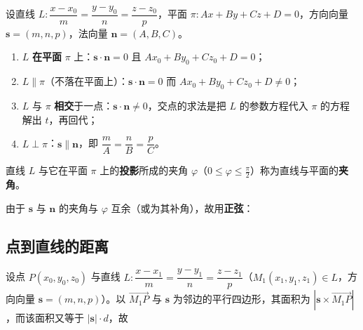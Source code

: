 设直线 $L:\dfrac{x-x_0}{m}=\dfrac{y-y_0}{n}=\dfrac{z-z_0}{p}$，平面 $\pi:Ax+By+Cz+D=0$，方向向量 $\boldsymbol{s}=(m,n,p)$，法向量 $\boldsymbol{n}=(A,B,C)$。

\begin{enumerate}
\item $L$ \textbf{在平面} $\pi$ 上：$\boldsymbol{s}\cdot\boldsymbol{n}=0$ 且 $Ax_0+By_0+Cz_0+D=0$；
\item $L\parallel\pi$（不落在平面上）：$\boldsymbol{s}\cdot\boldsymbol{n}=0$ 而 $Ax_0+By_0+Cz_0+D\neq0$；
\item $L$ 与 $\pi$ \textbf{相交}于一点：$\boldsymbol{s}\cdot\boldsymbol{n}\neq0$，交点的求法是把 $L$ 的参数方程代入 $\pi$ 的方程解出 $t$，再回代；
\item $L\perp\pi$：$\boldsymbol{s}\parallel\boldsymbol{n}$，即 $\dfrac{m}{A}=\dfrac{n}{B}=\dfrac{p}{C}$。
\end{enumerate}

\begin{definition}
直线 $L$ 与它在平面 $\pi$ 上的\textbf{投影}所成的夹角 $\varphi$（$0\le\varphi\le\frac{\pi}{2}$）称为直线与平面的\textbf{夹角}。
\end{definition}

由于 $\boldsymbol{s}$ 与 $\boldsymbol{n}$ 的夹角与 $\varphi$ 互余（或为其补角），故用\textbf{正弦}：



\subsection{点到直线的距离}

设点 $P(x_0,y_0,z_0)$ 与直线 $L:\dfrac{x-x_1}{m}=\dfrac{y-y_1}{n}=\dfrac{z-z_1}{p}$（$M_1(x_1,y_1,z_1)\in L$，方向向量 $\boldsymbol{s}=(m,n,p)$）。以 $\overrightarrow{M_1P}$ 与 $\boldsymbol{s}$ 为邻边的平行四边形，其面积为 $|\boldsymbol{s}\times\overrightarrow{M_1P}|$，而该面积又等于 $|\boldsymbol{s}|\cdot d$，故

